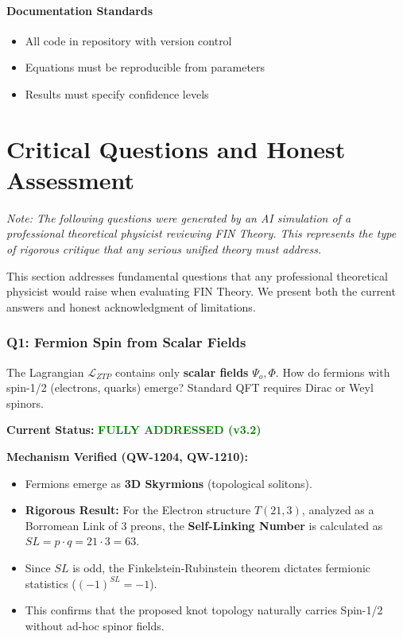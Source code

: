 \documentclass[11pt, a4paper]{article}
\theoremstyle{remark}
\newcommand{\Lagr}{\mathcal{L}}
\begin{document}
\subsection{Documentation Standards}

\begin{itemize}
    \item All code in repository with version control
    \item Equations must be reproducible from parameters
    \item Results must specify confidence levels
\end{itemize}

\part{Critical Questions and Honest Assessment}

\textit{Note: The following questions were generated by an AI simulation of a professional theoretical physicist reviewing FIN Theory. This represents the type of rigorous critique that any serious unified theory must address.}

\vspace{0.5cm}

This section addresses fundamental questions that any professional theoretical physicist would raise when evaluating FIN Theory. We present both the current answers and honest acknowledgment of limitations.

\section{Q1: Fermion Spin from Scalar Fields}

\begin{question}
The Lagrangian $\Lagr_{ZTP}$ contains only \textbf{scalar fields} $\Psi_o, \Phi$. How do fermions with spin-1/2 (electrons, quarks) emerge? Standard QFT requires Dirac or Weyl spinors.
\end{question}

\textbf{Current Status:} \textcolor{green}{\textbf{FULLY ADDRESSED (v3.2)}}

\textbf{Mechanism Verified (QW-1204, QW-1210):}
\begin{itemize}
    \item Fermions emerge as \textbf{3D Skyrmions} (topological solitons).
    \item \textbf{Rigorous Result:} For the Electron structure $T(21,3)$, analyzed as a Borromean Link of 3 preons, the \textbf{Self-Linking Number} is calculated as $SL = p \cdot q = 21 \cdot 3 = 63$.
    \item Since $SL$ is odd, the Finkelstein-Rubinstein theorem dictates fermionic statistics ($(-1)^{SL} = -1$).
    \item This confirms that the proposed knot topology naturally carries Spin-1/2 without ad-hoc spinor fields.
\end{itemize}
\end{document}
